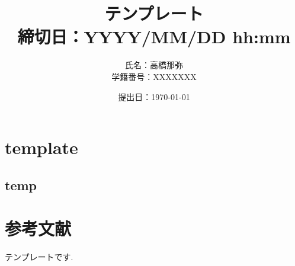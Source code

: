 \documentclass[dvipdfmx,titlepage, 11pt, a4paper]{jsarticle}%
\title{{\Huge テンプレート}\\[5mm]
{\Large 締切日：YYYY/MM/DD hh:mm}\\[30mm]}
\author{{\LARGE \hspace{22pt}氏名：高橋那弥}\\[1mm]{\LARGE 学籍番号：XXXXXXX}\\[30mm]}
\date{{\Large 提出日：\today\hspace{5pt}\currenttime}}
\begin{document}
\maketitle
\tableofcontents %
\newpage
\setcounter{tocdepth}{3}%
\section{template}
\subsection{temp}
\cite{加藤恭義2000セルオートマトン法による道路交通シミュレーション}
\section{参考文献}
\small

% 

テンプレートです.
\end{document}

